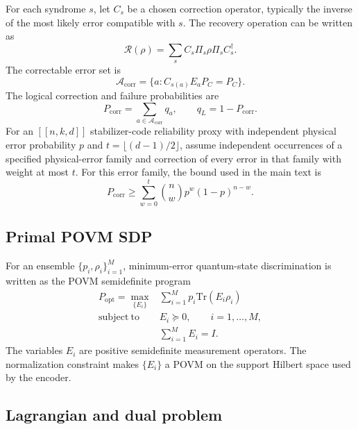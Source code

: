 \documentclass[
 reprint,
 amsmath,amssymb,
 aps,
 pra,
 floatfix,
]{revtex4-2}
\begin{document}
For each syndrome $s$, let $C_s$ be a chosen correction operator, typically the inverse of the most likely error compatible with $s$. The recovery operation can be written as
\begin{equation}
    \mathcal{R}(\rho)
    =
    \sum_s
    C_s\Pi_s\rho\Pi_s C_s^\dagger .
\end{equation}
The correctable error set is
\begin{equation}
    \mathcal{A}_{\mathrm{corr}}
    =
    \{a:C_{s(a)}E_aP_C=P_C\}.
\end{equation}
The logical correction and failure probabilities are
\begin{equation}
    P_{\mathrm{corr}}
    =
    \sum_{a\in\mathcal{A}_{\mathrm{corr}}}q_a,
    \qquad
    q_L
    =
    1-P_{\mathrm{corr}}.
\end{equation}
For an $[[n,k,d]]$ stabilizer-code reliability proxy with independent physical error probability $p$ and $t=\lfloor(d-1)/2\rfloor$, assume independent occurrences of a specified physical-error family and correction of every error in that family with weight at most $t$. For this error family, the bound used in the main text is
\begin{equation}
    P_{\mathrm{corr}}
    \geq
    \sum_{w=0}^{t}
    \binom{n}{w}p^w(1-p)^{n-w}.
\end{equation}

\subsection{Primal POVM SDP}

For an ensemble $\{p_i,\rho_i\}_{i=1}^M$, minimum-error quantum-state discrimination is written as the POVM semidefinite program
\begin{align}
    P_{\mathrm{opt}}
    =
    \max_{\{E_i\}}
    &\sum_{i=1}^M p_i\mathrm{Tr}(E_i\rho_i)
    \label{eq:appendix_primal_sdp}\\
    \mathrm{subject\ to}\quad
    &E_i\succeq0,\qquad i=1,\ldots,M,\nonumber\\
    &\sum_{i=1}^M E_i=I.\nonumber
\end{align}
The variables $E_i$ are positive semidefinite measurement operators. The normalization constraint makes $\{E_i\}$ a POVM on the support Hilbert space used by the encoder.

\subsection{Lagrangian and dual problem}
\end{document}
